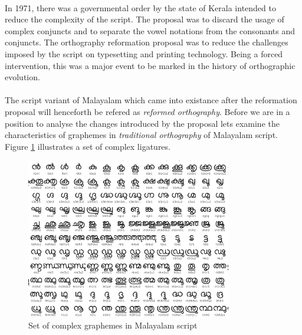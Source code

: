\documentclass[10pt]{article}
\begin{document}
\paragraph{}
In 1971, there was a governmental order by the state of Kerala intended to reduce the complexity of the script. The proposal was to discard the usage of complex conjuncts and to separate the vowel notations from the consonants and conjuncts. The orthography reformation proposal was to reduce the challenges imposed by the script on typesetting and printing technology. Being a forced intervention, this was a major event to be marked in the history of orthographic evolution. 

\paragraph{}
The script variant of Malayalam which came into existance after the reformation proposal will henceforth be refered as \textit{reformed orthography}. Before we are in a position to analyse the changes introduced by the proposal lets examine the characteristics of graphemes in \textit{traditional orthography} of Malayalam script. Figure \ref{complexgrapheme} illustrates a set of complex ligatures. 

\begin{figure}[h!]
	\centering
	\includegraphics[width=0.8\textwidth]{images/complexgraphemes.png}
	\caption{Set of complex graphemes in Malayalam script}
	\label{complexgrapheme}
\end{figure}
\end{document}
